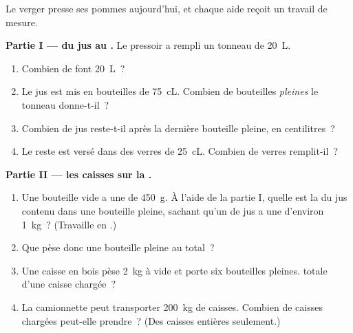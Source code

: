 \begin{problem}\label{pb:g6:mass-and-volume:1}
Le verger presse ses pommes aujourd'hui, et chaque aide reçoit un
travail de mesure.

\medskip\noindent\textbf{Partie I --- du jus au .}
Le pressoir a rempli un tonneau de \qty{20}{L}.
\begin{enumerate}
  \item Combien de  font \qty{20}{L}~?
  \item Le jus est mis en bouteilles de \qty{75}{cL}. Combien de
        bouteilles \emph{pleines} le tonneau donne-t-il~?
  \item Combien de jus reste-t-il après la dernière bouteille
        pleine, en centilitres~?
  \item Le reste est versé dans des verres de \qty{25}{cL}. Combien
        de verres remplit-il~?
\end{enumerate}

\medskip\noindent\textbf{Partie II --- les caisses sur la .}
\begin{enumerate}[resume]
  \item Une bouteille vide a une  de \qty{450}{g}. À l'aide de
        la partie I, quelle est la  du jus contenu dans une
        bouteille pleine, sachant qu'un  de jus a une 
        d'environ \qty{1}{kg}~? (Travaille en .)
  \item Que pèse donc une bouteille pleine au total~?
  \item Une caisse en bois pèse \qty{2}{kg} à vide et porte six
        bouteilles pleines.  totale d'une caisse chargée~?
  \item La camionnette peut transporter \qty{200}{kg} de caisses.
        Combien de caisses chargées peut-elle prendre~? (Des
        caisses entières seulement.)
\end{enumerate}


\end{problem}
